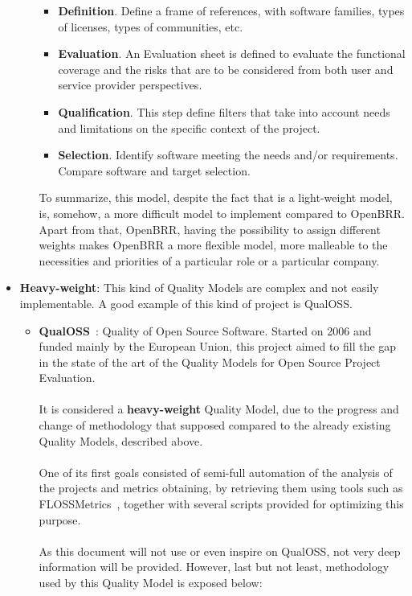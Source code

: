 \documentclass[11pt]{article}
\begin{document}
\begin{itemize}
\begin{itemize}
\begin{itemize}\itemsep0pt
\item{\textbf{Definition}}. Define a frame of references, with software families, types of licenses, types of communities, etc.
\item{\textbf{Evaluation}}. An Evaluation sheet is defined to evaluate the functional coverage and the risks that are to be considered from both user and service provider perspectives.
\item{\textbf{Qualification}}. This step define filters that take into account needs and limitations on the 
specific context of the project.
\item{\textbf{Selection}}. Identify software meeting the needs and/or requirements. Compare software and target selection.
\end{itemize}
To summarize, this model, despite the fact that is a light-weight model, is, somehow, a more difficult model to implement compared to OpenBRR. Apart from that, OpenBRR, having the possibility to assign different weights makes OpenBRR a more flexible model, more malleable to the necessities and priorities of a particular role or a particular company.
\end{itemize}
\item{\textbf{Heavy-weight}}: This kind of Quality Models are complex and not easily implementable. A good example of this kind of project is QualOSS.
\begin{itemize}\itemsep0pt
\item{\textbf{QualOSS}}~\cite{QUALOSS00}: Quality of Open Source Software. Started on 2006 and funded mainly by the European Union, this project aimed to fill the gap in the state of the art of the Quality Models for Open Source Project Evaluation.\\
\\
It is considered a \textbf{heavy-weight} Quality Model, due to the progress and change of methodology that supposed compared to the already existing Quality Models, described above.\\
\\
One of its first goals consisted of semi-full automation of the analysis of the projects and metrics obtaining, by retrieving them using tools such as FLOSSMetrics~\cite{FLOSSM00}, together with several scripts provided for optimizing this purpose.\\
\\
As this document will not use or even inspire on QualOSS, not very deep information will be provided. However, last but not least, methodology used by this Quality Model is exposed below:

\end{itemize}
\end{itemize}
\end{document}
